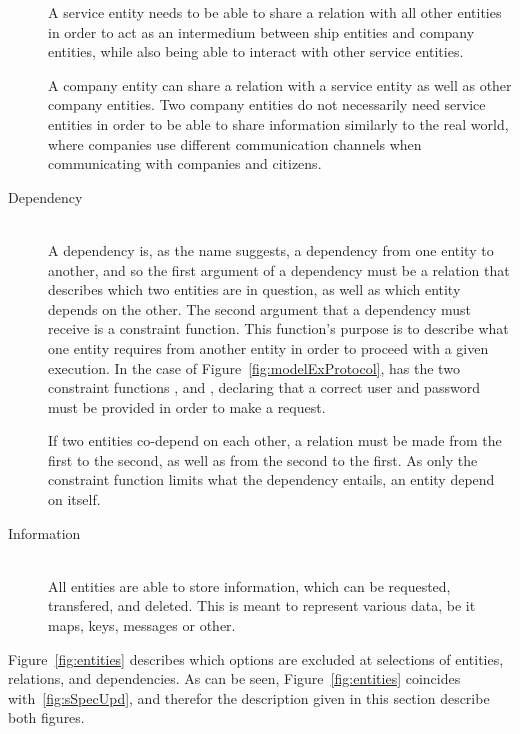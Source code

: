 \begin{description}
    A service entity needs to be able to share a relation with all other entities in order to act as an intermedium between ship entities and company entities, while also being able to interact with other service entities.

    A company entity can share a relation with a service entity as well as other company entities. Two company entities do not necessarily need service entities in order to be able to share information similarly to the real world, where companies use different communication channels when communicating with companies and citizens.
  \item[Dependency]\ \\
    A dependency is, as the name suggests, a dependency from one entity to another, and so the first argument of a dependency must be a relation that describes which two entities are in question, as well as which entity depends on the other. The second argument that a dependency must receive is a constraint function. This function's purpose is to describe what one entity requires from another entity in order to proceed with a given execution. In the case of Figure~\ref{fig:modelExProtocol},  has the two constraint functions , and , declaring that a correct user and password must be provided in order to make a request. 

    If two entities co-depend on each other, a relation must be made from the first to the second, as well as from the second to the first. As only the constraint function limits what the dependency entails, an entity  depend on itself.
  \item[Information]\ \\
    All entities are able to store information, which can be requested, transfered, and deleted. This is meant to represent various data, be it maps, keys, messages or other.
\end{description}
\noindent
Figure~\ref{fig:entities} describes which options are excluded at selections of entities, relations, and dependencies. As can be seen, Figure~\ref{fig:entities} coincides with~\ref{fig:sSpecUpd}, and therefor the description given in this section describe both figures. 

